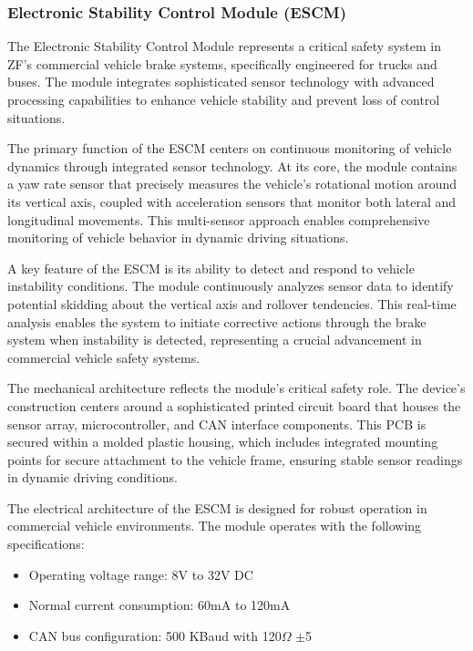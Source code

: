 \documentclass[12pt]{article}
\begin{document}
\subsubsection{Electronic Stability Control Module (ESCM)}
The Electronic Stability Control Module represents a critical safety system in
ZF's commercial vehicle brake systems, specifically engineered for trucks and
buses. The module integrates sophisticated sensor technology with advanced
processing capabilities to enhance vehicle stability and prevent loss of
control situations.

The primary function of the ESCM centers on continuous monitoring of vehicle
dynamics through integrated sensor technology. At its core, the module contains
a yaw rate sensor that precisely measures the vehicle's rotational motion
around its vertical axis, coupled with acceleration sensors that monitor both
lateral and longitudinal movements. This multi-sensor approach enables
comprehensive monitoring of vehicle behavior in dynamic driving situations.

A key feature of the ESCM is its ability to detect and respond to vehicle
instability conditions. The module continuously analyzes sensor data to
identify potential skidding about the vertical axis and rollover tendencies.
This real-time analysis enables the system to initiate corrective actions
through the brake system when instability is detected, representing a crucial
advancement in commercial vehicle safety systems.

The mechanical architecture reflects the module's critical safety role. The
device's construction centers around a sophisticated printed circuit board that
houses the sensor array, microcontroller, and CAN interface components. This
PCB is secured within a molded plastic housing, which includes integrated
mounting points for secure attachment to the vehicle frame, ensuring stable
sensor readings in dynamic driving conditions.

The electrical architecture of the ESCM is designed for robust operation in
commercial vehicle environments. The module operates with the following
specifications:

\begin{itemize}
    \item Operating voltage range: 8V to 32V DC
    \item Normal current consumption: 60mA to 120mA
    \item CAN bus configuration: 500 KBaud with 120$\Omega$ $\pm$5%
\end{itemize}
\end{document}
